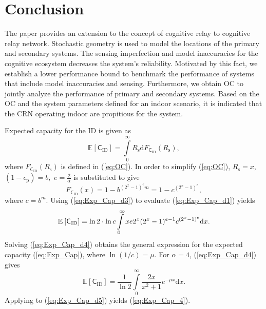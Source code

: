 \documentclass[conference, twocolumn]{IEEEtran}
\newcommand{\e}[2]{{\mathbb E}_{#1}\left[ #2 \right]}
\newcommand{\sub}[1]{_{\text{#1}}}
\begin{document}
\section{Conclusion} \label{sec:conc}
The paper provides an extension to the concept of cognitive relay to cognitive relay network. Stochastic geometry is used to model the locations of the primary and secondary systems. The sensing imperfection and model inaccuracies for the cognitive ecosystem decreases the system's reliability. Motivated by this fact, we establish a lower performance bound to benchmark the performance of systems that include model inaccuracies and sensing. Furthermore, we obtain OC to jointly analyze the performance of primary and secondary systems. Based on the OC and the system parameters defined for an indoor scenario, it is indicated that the CRN operating indoor are propitious for the system.
\begin{IEEEproof}
\normalfont
Expected capacity for the ID is given as
\begin{equation}
\e{}{\mathsf{C}\sub{ID}} = \int\limits_{0}^{\infty} R\sub{s} \text{d} F_{\mathsf{C}\sub{ID}}(R\sub{s}) \label{eq:Exp_Cap_d1},  
\end{equation}
where $F_{\mathsf{C}\sub{ID}}(R\sub{s})$ is defined in (\ref{eq:OC}). In order to simplify (\ref{eq:OC}), $R\sub{s} = x$, $(1-\epsilon\sub{p}) = b,$ $e = \frac{2}{\alpha}$ is substituted to give
\begin{equation}
F_{\mathsf{C}\sub{ID}}(x) = 1 - b^{\left( 2^{x}-1 \right)^{e} m } = 1 - c^{\left( 2^{x}-1 \right)^{e}}, \label{eq:Exp_Cap_d3}  
\end{equation}
where $c = b^m$. Using (\ref{eq:Exp_Cap_d3}) to evaluate (\ref{eq:Exp_Cap_d1}) yields 
\begin{equation}
\e{}{\mathsf{C}\sub{ID}} = \ln 2 \cdot \ln c \int\limits_{0}^{\infty} x e 2^x (2^x - 1)^{e-1} c^{(2^x - 1)^e} \text{d}x. \label{eq:Exp_Cap_d4} \\
\end{equation}
Solving (\ref{eq:Exp_Cap_d4}) obtains the general expression for the expected capacity (\ref{eq:Exp_Cap}), where $\ln({1}/{c}) = \mu$. For $\alpha = 4$, (\ref{eq:Exp_Cap_d4}) gives
\begin{equation}
\e{}{\mathsf{C}\sub{ID}} = \frac{1}{\ln 2} \int\limits_{0}^{\infty} \frac{2x}{x^2 + 1} e^{-\mu x} \text{d}x. \label{eq:Exp_Cap_d5}  
\end{equation}
Applying \cite[3.354]{grad} to (\ref{eq:Exp_Cap_d5}) yields (\ref{eq:Exp_Cap_4}).
\end{IEEEproof}





\end{document}
